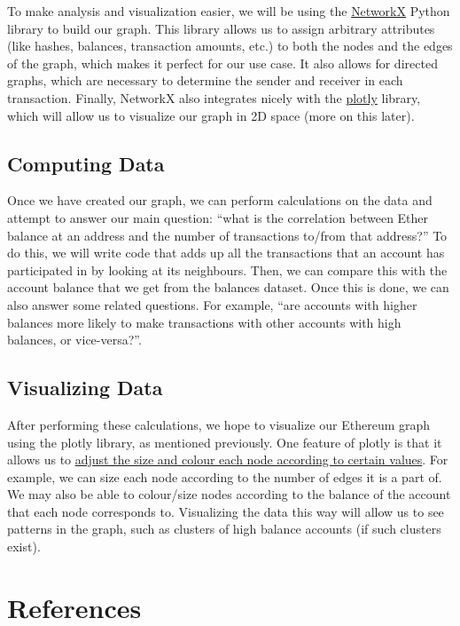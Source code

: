 \documentclass[fontsize=11pt]{article}
\begin{document}
To make analysis and visualization easier, we will be using the \href{https://networkx.org/}{NetworkX} Python library to build our graph. This library allows us to assign arbitrary attributes (like hashes, balances, transaction amounts, etc.) to both the nodes and the edges of the graph, which makes it perfect for our use case. It also allows for directed graphs, which are necessary to determine the sender and receiver in each transaction. Finally, NetworkX also integrates nicely with the \href{https://plotly.com/}{plotly} library, which will allow us to visualize our graph in 2D space (more on this later).

\subsection*{Computing Data}

Once we have created our graph, we can perform calculations on the data and attempt to answer our main question: “what is the correlation between Ether balance at an address and the number of transactions to/from that address?” To do this, we will write code that adds up all the transactions that an account has participated in by looking at its neighbours. Then, we can compare this with the account balance that we get from the balances dataset. Once this is done, we can also answer some related questions. For example, “are accounts with higher balances more likely to make transactions with other accounts with high balances, or vice-versa?”.

\subsection*{Visualizing Data}

After performing these calculations, we hope to visualize our Ethereum graph using the plotly library, as mentioned previously. One feature of plotly is that it allows us to \href{https://plotly.com/python/network-graphs/#color-node-points}{adjust the size and colour each node according to certain values}. For example, we can size each node according to the number of edges it is a part of. We may also be able to colour/size nodes according to the balance of the account that each node corresponds to. Visualizing the data this way will allow us to see patterns in the graph, such as clusters of high balance accounts (if such clusters exist).

\section*{References}
\end{document}
